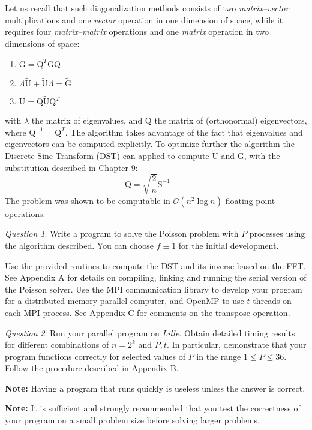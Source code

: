 \documentclass[onecolumn, oneside, a4paper, 11pt]{memoir}
\theoremstyle{remark}
\newtheorem{ex}{Question}
\newcommand{\mG}{{\mathrm G}}
\newcommand{\mQ}{{\mathrm Q}}
\newcommand{\mS}{{\mathrm S}}
\newcommand{\mU}{{\mathrm U}}
\newcommand{\mEVa}{{\Lambda}}
\begin{document}
\medskip
Let us recall that such diagonalization methods consists of two \textit{matrix--vector} multiplications and one \textit{vector} operation in one dimension of space, while it requires four \textit{matrix--matrix} operations and one \textit{matrix} operation in two dimensions of space:
\begin{enumerate}
\item $\tilde\mG = \mQ^T\mG\mQ$
\item $\mEVa\tilde\mU + \tilde\mU\mEVa= \tilde\mG$
\item $\mU = \mQ\tilde\mU\mQ^T$
\end{enumerate}
with $\lambda$ the matrix of eigenvalues, and $\mQ$ the matrix of (orthonormal) eigenvectors, where $\mQ^{-1} = \mQ^T$.
The algorithm takes advantage of the fact that eigenvalues and eigenvectors can be computed explicitly.
To optimize further the algorithm the Discrete Sine Transform (DST) can applied to compute $\tilde\mU$ and $\tilde\mG$, with the substitution described in Chapter 9:
\[
\mQ = \sqrt{\frac{2}{n}} \mS^{-1}\qquad
\]
The problem was shown to be computable in $\mathcal{O}(n^2\log n)$ floating-point operations.

\bigskip
\begin{ex}
  Write a program to solve the Poisson problem with $P$ processes using the
  algorithm described. You can choose $f \equiv 1$ for the initial
  development.

  Use the provided routines to compute the DST and its inverse based on the FFT.
  See Appendix A for details on compiling, linking and running the serial
  version of the Poisson solver. Use the MPI communication library to develop
  your program for a distributed memory parallel computer, and OpenMP to use $t$
  threads on each MPI process. See Appendix C for comments on the transpose
  operation.
\end{ex}

\bigskip
\begin{ex}
  Run your parallel program on \emph{Lille}. Obtain detailed timing results for
  different combinations of $n=2^k$ and $P, t$. In particular, demonstrate that
  your program functions correctly for selected values of $P$ in the range
  $1 \leq P \leq 36$. Follow the procedure described in Appendix B.

  \textbf{Note:} Having a program that runs quickly is useless unless the answer
  is correct.

  \textbf{Note:} It is sufficient and strongly recommended that you test the
  correctness of your program on a small problem size before solving larger
  problems.
\end{ex}
\end{document}
